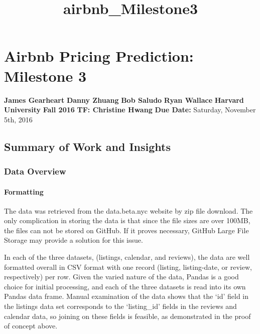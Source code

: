 \documentclass[11pt]{article}
\title{airbnb\_Milestone3}
\begin{document}
    
    
    \maketitle
    
    

    
    \section{Airbnb Pricing Prediction: Milestone
3}\label{airbnb-pricing-prediction-milestone-3}

\textbf{James Gearheart} \textbf{Danny Zhuang} \textbf{Bob Saludo}
\textbf{Ryan Wallace} \textbf{Harvard University} \textbf{Fall 2016}
\textbf{TF: Christine Hwang} \textbf{Due Date: } Saturday, November 5th,
2016

    \subsection{Summary of Work and
Insights}\label{summary-of-work-and-insights}

\subsubsection{Data Overview}\label{data-overview}

\paragraph{Formatting}\label{formatting}

The data was retrieved from the data.beta.nyc website by zip file
download. The only complication in storing the data is that since the
file sizes are over 100MB, the files can not be stored on GitHub. If it
proves necessary, GitHub Large File Storage may provide a solution for
this issue.

In each of the three datasets, (listings, calendar, and reviews), the
data are well formatted overall in CSV format with one record (listing,
listing-date, or review, respectively) per row. Given the varied nature
of the data, Pandas is a good choice for initial processing, and each of
the three datasets is read into its own Pandas data frame. Manual
examination of the data shows that the `id' field in the listings data
set corresponds to the `listing\_id' fields in the reviews and calendar
data, so joining on these fields is feasible, as demonstrated in the
proof of concept above.
\end{document}
